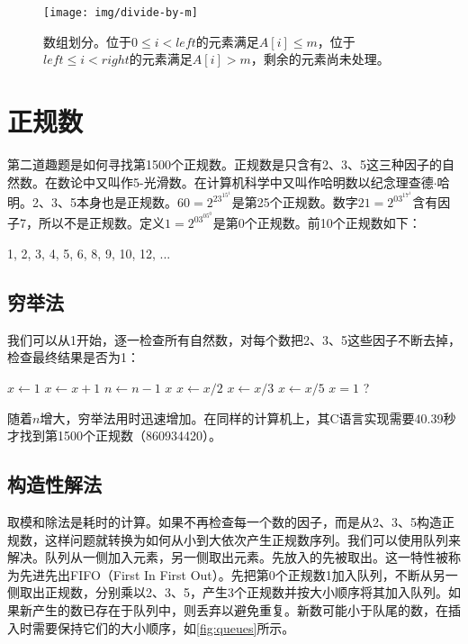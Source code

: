 \documentclass[b5paper]{ctexart}
\begin{document}
\begin{figure}[htbp]
  \centering
  \texttt{[image: img/divide-by-m]}
  \caption{数组划分。位于$0 \leq i < left$的元素满足$A[i] \leq m$，位于$left \leq i < right$的元素满足$A[i] > m$，剩余的元素尚未处理。}
  \label{fig:divide}
\end{figure}

\section*{正规数}

第二道趣题是如何寻找第1500个正规数。正规数是只含有2、3、5这三种因子的自然数。在数论中又叫作5-光滑数。在计算机科学中又叫作哈明数以纪念理查德$\cdot$哈明。2、3、5本身也是正规数。$60 = 2^23^15^1$是第25个正规数。数字$21 = 2^03^17^1$含有因子7，所以不是正规数。定义$1=2^03^05^0$是第0个正规数。前10个正规数如下：

1, 2, 3, 4, 5, 6, 8, 9, 10, 12, ...

\subsection*{穷举法}
我们可以从1开始，逐一检查所有自然数，对每个数把2、3、5这些因子不断去掉，检查最终结果是否为1：

\begin{algorithmic}[1]
  \State $x \gets 1$
    \State $x \gets x + 1$
      \State $n \gets n - 1$
    \EndIf
  \EndWhile
  \State \Return $x$
\EndFunction
\Statex
{}
    \State $x \gets x / 2$
  \EndWhile
    \State $x \gets x / 3$
  \EndWhile
    \State $x \gets x / 5$
  \EndWhile
  \State \Return $x = 1$ ?
\EndFunction
\end{algorithmic}

随着$n$增大，穷举法用时迅速增加。在同样的计算机上，其C语言实现需要40.39秒才找到第1500个正规数（860934420）。

\subsection*{构造性解法}
取模和除法是耗时的计算\cite{Bentley}。如果不再检查每一个数的因子，而是从2、3、5构造正规数，这样问题就转换为如何从小到大依次产生正规数序列。我们可以使用队列来解决。队列从一侧加入元素，另一侧取出元素。先放入的先被取出。这一特性被称为先进先出FIFO（First In First Out）。先把第0个正规数1加入队列，不断从另一侧取出正规数，分别乘以2、3、5，产生3个正规数并按大小顺序将其加入队列。如果新产生的数已存在于队列中，则丢弃以避免重复。新数可能小于队尾的数，在插入时需要保持它们的大小顺序，如\cref{fig:queues}所示。
\end{document}
